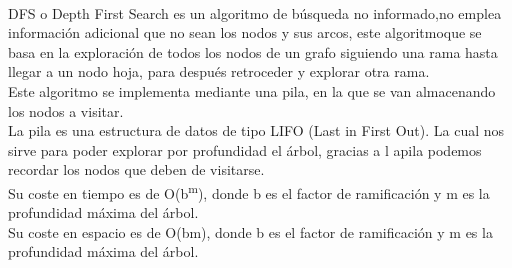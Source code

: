 \documentclass{report}
\begin{document}
          \paragraph*{}{
            DFS o Depth First Search es un algoritmo de búsqueda no informado,no emplea información adicional que no sean los nodos y sus arcos, este algoritmoque se basa en la exploración de todos los nodos de un grafo siguiendo una rama hasta llegar a un nodo hoja, para después retroceder y explorar otra rama.\\
            
            Este algoritmo se implementa mediante una pila, en la que se van almacenando los nodos a visitar.\\
            La pila es una estructura de datos de tipo LIFO (Last in First Out). La cual nos sirve para poder explorar por profundidad el árbol, gracias a l apila podemos recordar los nodos que deben de visitarse.\\
            
            Su coste en tiempo es de O(b\textsuperscript{m}), donde b es el factor de ramificación y m es la profundidad máxima del árbol.\\
            Su coste en espacio es de O(bm), donde b es el factor de ramificación y m es la profundidad máxima del árbol.\\
          }
\end{document}
